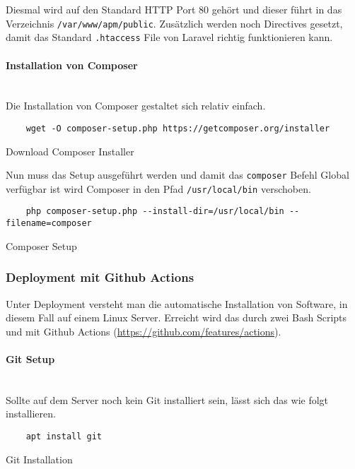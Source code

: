 Diesmal wird auf den Standard HTTP Port 80 gehört und dieser führt in das Verzeichnis \verb|/var/www/apm/public|. Zusätzlich werden noch Directives gesetzt, damit das Standard \verb|.htaccess| File von Laravel richtig funktionieren kann.

\paragraph{Installation von Composer}\mbox{}\\

Die Installation von Composer gestaltet sich relativ einfach.

\begin{listing}[H]
  \begin{verbatim}
    wget -O composer-setup.php https://getcomposer.org/installer
  \end{verbatim}
  \caption{Download Composer Installer}
\end{listing}

Nun muss das Setup ausgeführt werden und damit das \verb|composer| Befehl Global verfügbar ist wird Composer in den Pfad \verb|/usr/local/bin| verschoben.

\begin{listing}[H]
  \begin{verbatim}
    php composer-setup.php --install-dir=/usr/local/bin --filename=composer
  \end{verbatim}
  \caption{Composer Setup}
\end{listing}


\subsubsection{Deployment mit Github Actions}
Unter Deployment versteht man die automatische Installation von Software, in diesem Fall auf einem Linux Server. Erreicht wird das durch zwei Bash Scripts und mit Github Actions (\url{https://github.com/features/actions}).

\paragraph{Git Setup}\mbox{}\\

Sollte auf dem Server noch kein Git installiert sein, lässt sich das wie folgt
installieren.

\begin{listing}[H]
  \begin{verbatim}
    apt install git
  \end{verbatim}
  \caption{Git Installation}
\end{listing}

